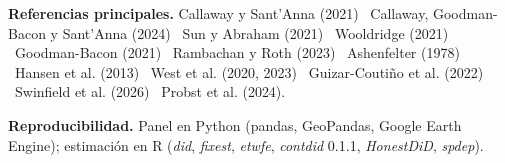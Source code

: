 \documentclass[final,t]{beamer}
\begin{document}
\begin{frame}[t]{}
\colorbox{tinta}{%
\begin{minipage}[t]{\dimexpr\paperwidth-1.998cm\relax}
\vspace{0.583cm}
\hspace{0.666cm}%
\begin{minipage}[t]{0.63\linewidth}
  {\color{papel!65}\small\textbf{\color{papel}Referencias principales.}
  Callaway y Sant'Anna (2021) \textbullet\ Callaway, Goodman-Bacon y Sant'Anna (2024)
  \textbullet\ Sun y Abraham (2021) \textbullet\ Wooldridge (2021) \textbullet\ Goodman-Bacon (2021)
  \textbullet\ Rambachan y Roth (2023) \textbullet\ Ashenfelter (1978) \textbullet\ Hansen et al. (2013)
  \textbullet\ West et al. (2020, 2023) \textbullet\ Guizar-Coutiño et al. (2022)
  \textbullet\ Swinfield et al. (2026) \textbullet\ Probst et al. (2024).}
\end{minipage}\hfill
\begin{minipage}[t]{0.32\linewidth}
  {\color{papel!65}\small\textbf{\color{papel}Reproducibilidad.}
  Panel en Python (pandas, GeoPandas, Google Earth Engine); estimación en R
  (\textit{did}, \textit{fixest}, \textit{etwfe}, \textit{contdid} 0.1.1, \textit{HonestDiD}, \textit{spdep}).}
\end{minipage}
\hspace{0.666cm}
\vspace{0.583cm}
\end{minipage}}

\end{frame}
\end{document}
